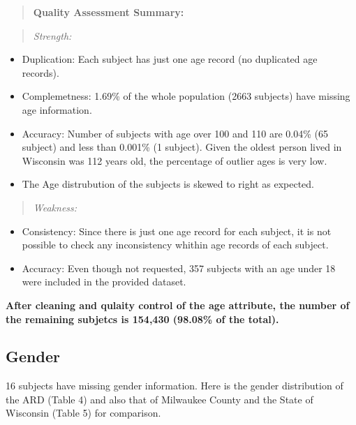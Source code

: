 \documentclass{article}
\begin{document}
\begin{quote}
\textbf{Quality Assessment Summary:}
\end{quote}
\begin{quote}
\emph{Strength:}
\end{quote}
\begin{itemize}
  \item Duplication: Each subject has just one age record (no duplicated age records).
  \item Complemetness: 1.69\% of the whole population (2663 subjects) have missing age information.
  \item Accuracy: Number of subjects with age over 100 and 110 are 0.04\% (65 subject) and less than 0.001\% (1 subject). Given the oldest person lived in Wisconsin was 112 years old, the percentage of outlier ages is very low.
  \item The Age distrubution of the subjects is skewed to right as expected.
\end{itemize}
\begin{quote}
\emph{Weakness:}
\end{quote}
\begin{itemize}
  \item Consistency: Since there is just one age record for each subject, it is not possible to check any inconsistency whithin age records of each subject.
  \item Accuracy: Even though not requested, 357 subjects with an age under 18 were included in the provided dataset.
\end{itemize}

\textbf{After cleaning and qulaity control of the age attribute, the number of the remaining subjetcs is 154,430 (98.08\% of the total).} 

\subsection{Gender}

16 subjects have missing gender information.
Here is the gender distribution of the ARD (Table 4) and also that of Milwaukee County and the State of Wisconsin (Table 5) for comparison. 
\end{document}
